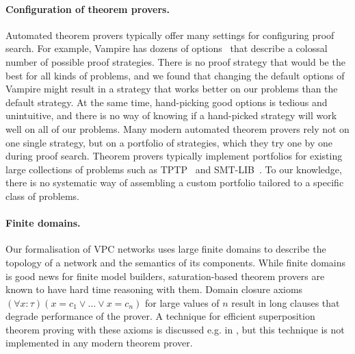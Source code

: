 
\paragraph{Configuration of theorem provers.}
Automated theorem provers typically offer many settings for configuring proof search. For example, Vampire has dozens of options~\cite{DBLP:conf/cade/Reger0V14} that describe a colossal number of possible proof strategies. There is no proof strategy that would be the best for all kinds of problems, and we found that changing the default options of Vampire might result in a strategy that works better on our problems than the default strategy. At the same time, hand-picking good options is tedious and unintuitive, and there is no way of knowing if a hand-picked strategy will work well on all of our problems. Many modern automated theorem provers rely not on one single strategy, but on a portfolio of strategies, which they try one by one during proof search. Theorem provers typically implement portfolios for existing large collections of problems such as TPTP~\cite{TPTP} and SMT-LIB~\cite{SMT-LIB}. To our knowledge, there is no systematic way of assembling a custom portfolio tailored to a specific class of problems.


\paragraph{Finite domains.}
Our formalisation of VPC networks uses large finite domains to describe the topology of a network and the semantics of its components. While finite domains is good news for finite model builders, saturation-based theorem provers are known to have hard time reasoning with them. Domain closure axioms $(\forall x:\tau)(x=c_1 \vee\ldots\vee x=c_n)$ for large values of $n$ result in long clauses that degrade performance of the prover. A technique for efficient superposition theorem proving with these axioms is discussed e.g. in \cite{HillenbrandWeidenbach13}, but this technique is not implemented in any modern theorem prover.

